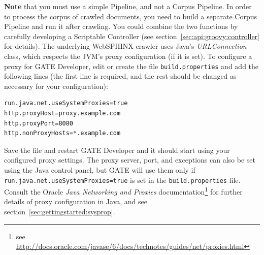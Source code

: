 \textbf{Note} that you must use a simple Pipeline, and not a Corpus Pipeline. In
order to process the corpus of crawled documents, you need to build a separate
Corpus Pipeline and run it after crawling.  You could combine the two functions
by carefully developing a Scriptable Controller (see
section~\ref{sec:api:groovy:controller} for details).
The underlying WebSPHINX crawler uses Java's \emph{URLConnection} class, which
respects the JVM's proxy configuration (if it is set).  To configure a proxy for
GATE Developer, edit or create the file \texttt{build.properties} and add the
following lines (the first line is required, and the rest should be changed as
necessary for your configuration):
\begin{verbatim}
run.java.net.useSystemProxies=true
http.proxyHost=proxy.example.com
http.proxyPort=8080
http.nonProxyHosts=*.example.com
\end{verbatim}
Save the file and restart GATE Developer and it should start using your
configured proxy settings.  The proxy server, port, and exceptions can also be
set using the Java control panel, but GATE will use them only if
\texttt{run.java.net.useSystemProxies=true} is set in the
\texttt{build.properties} file.  Consult the Oracle \emph{Java Networking and
  Proxies} documentation\footnote{see
  \url{http://docs.oracle.com/javase/6/docs/technotes/guides/net/proxies.html}}
for further details of proxy configuration in Java, and see 
section~\ref{sec:gettingstarted:sysprop}.

